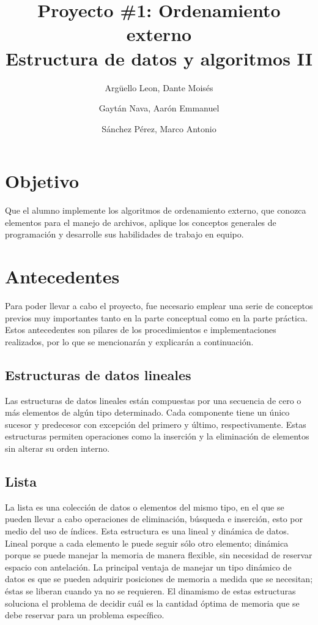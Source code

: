 \documentclass[11pt]{article}
\title{Proyecto \#1: Ordenamiento externo\\
Estructura de datos y algoritmos II}
\author{Argüello Leon, Dante Moisés
\and Gaytán Nava, Aarón Emmanuel
\and Sánchez Pérez, Marco Antonio}
\begin{document}
\maketitle{}

\section{Objetivo}
\par
Que el alumno implemente los algoritmos de ordenamiento externo, que conozca elementos para el manejo de archivos, aplique los conceptos generales de programación y desarrolle sus habilidades de trabajo en equipo.

\section{Antecedentes}
\par
Para poder llevar a cabo el proyecto, fue necesario emplear una serie de conceptos previos muy importantes tanto en la parte conceptual como en la parte práctica. Estos antecedentes son pilares de los procedimientos e implementaciones realizados, por lo que se mencionarán y explicarán a continuación.
\subsection{Estructuras de datos lineales}
\par
Las estructuras de datos lineales están compuestas por una secuencia de cero o más elementos de algún tipo determinado. Cada componente tiene un único sucesor y predecesor con excepción del primero y último, respectivamente. Estas estructuras permiten operaciones como la inserción y la eliminación de elementos sin alterar su orden interno.
\subsection{Lista}
\par
La lista es una colección de datos o elementos del mismo tipo, en el que se pueden llevar a cabo operaciones de eliminación, búsqueda e inserción, esto por medio del uso de índices. Esta estructura es una lineal y dinámica de datos. Lineal porque a cada elemento le puede seguir sólo otro elemento; dinámica porque se puede manejar la memoria de manera flexible, sin necesidad de reservar espacio con antelación. La principal ventaja de manejar un tipo dinámico de datos es que se pueden adquirir posiciones de memoria a medida que se necesitan; éstas se liberan cuando ya no se requieren. El dinamismo de estas estructuras soluciona el problema de decidir cuál es la cantidad óptima de memoria que se debe reservar para un problema específico.
\end{document}
